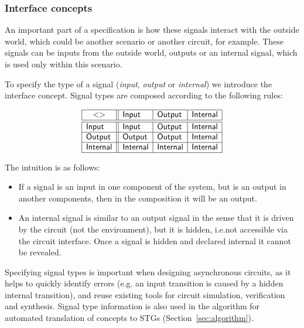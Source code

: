\documentclass[british,conference,compsoc]{IEEEtran}
\begin{document}
\vspace{-3mm}

\subsubsection{Interface concepts\label{sub:interface}} 

An important part of a specification is how these signals interact with the 
outside world, which could be another scenario or another circuit, for example.
These signals can be inputs from the outside world, outputs or an internal 
signal, which is used only within this scenario. 

To specify the type of a signal (\emph{input},
\emph{output} or \emph{internal}) we introduce the \textsf{interface} concept.
Signal types are composed according to the following rules:

\vspace{-2mm}

\[
\begin{array}{|l||l|l|l|}
\hline
\multicolumn{1}{|c||}{<>} & \mathsf{Input} & \mathsf{Output} &
\mathsf{Internal} \\ \hline \hline
\mathsf{Input} & \mathsf{Input} & \mathsf{Output} & \mathsf{Internal} \\ \hline
\mathsf{Output} & \mathsf{Output} & \mathsf{Output} & \mathsf{Internal} \\
\hline
\mathsf{Internal}& \mathsf{Internal} & \mathsf{Internal} & \mathsf{Internal} \\
\hline
\end{array}
\]

The intuition is as follows:
\begin{itemize}
    \item If a signal is an input in one component of the system, but is an
    output in another components, then in the composition it will be an output.
    \item An internal signal is similar to an output signal in the sense
that it is driven by the circuit (not the environment), but it is hidden, 
i.e.not accessible via the circuit interface. Once a signal is hidden and 
declared internal it cannot be revealed.
\end{itemize}

\noindent Specifying signal types is important when designing asynchronous
circuits, as it helps to quickly identify errors (e.g. an input transition is
caused by a hidden internal transition), and reuse existing tools for circuit
simulation, verification and synthesis. Signal type information is also used
in the algorithm for automated translation of concepts to
STGs (Section~\ref{sec:algorithm}).
\end{document}
